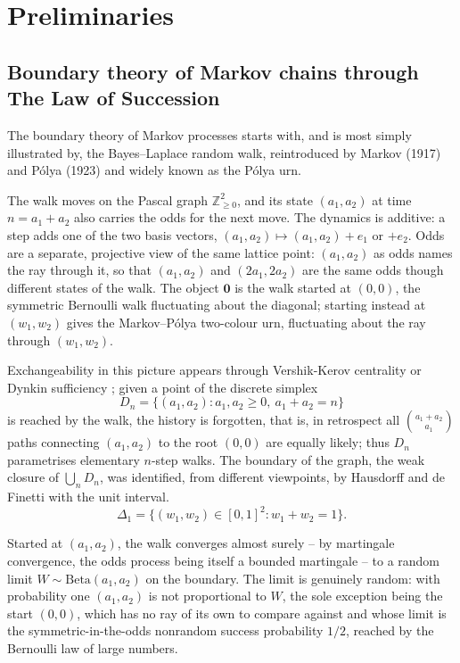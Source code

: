 \documentclass[11pt]{article}
\newcommand{\ZZ}{\mathbb{Z}}
\theoremstyle{plain}
\theoremstyle{definition}
\begin{document}
\section{Preliminaries}
\label{sec:prelim}
\subsection{Boundary theory of Markov chains through The Law of Succession}

The boundary theory of Markov processes starts with, and is most simply illustrated by, the Bayes--Laplace random walk, reintroduced by Markov (1917) and P\'olya (1923) and widely known as the P\'olya urn.

The walk moves on the Pascal graph \(\ZZ_{\ge0}^2\), and its state \((a_1,a_2)\) at time \(n=a_1+a_2\) also carries the odds for the next move. The dynamics is additive: a step adds one of the two basis vectors, \((a_1,a_2)\mapsto(a_1,a_2)+e_1\) or \(+e_2\). Odds are a separate, projective view of the same lattice point: \((a_1,a_2)\) as odds names the ray through it, so that \((a_1,a_2)\) and \((2a_1,2a_2)\) are the same odds though different states of the walk. The object \(\boldsymbol0\) is the walk started at \((0,0)\), the symmetric Bernoulli walk fluctuating about the diagonal; starting instead at \((w_1,w_2)\) gives the Markov--P\'olya two-colour urn, fluctuating about the ray through \((w_1,w_2)\).

Exchangeability in this picture appears through Vershik-Kerov \cite{BorodinOlshanski} centrality or Dynkin  
sufficiency \cite{DiaconisFridmanSufficiencyIndianInst};
given a point of the discrete simplex  
$$
D_n=\{(a_1,a_2):a_1,a_2\ge0,\ a_1+a_2=n\}$$ is reached by the walk, the history is forgotten, that is, in retrospect
all \(\binom{a_1+a_2}{a_1}\) paths connecting $(a_1,a_2)$ to the root $(0,0)$ are equally likely; thus $D_n$ parametrises elementary $n$-step walks. The boundary of the graph, the weak closure of \(\bigcup_nD_n\), was identified, from different viewpoints, by Hausdorff and de Finetti with the unit interval. 
$$\Delta_1=\{(w_1,w_2)\in [0,1]^2: w_1+w_2=1\}.$$

Started at \((a_1,a_2)\), the walk converges almost surely -- by martingale convergence, the odds process being itself a bounded martingale -- to a random limit \(W\sim\mathrm{Beta}(a_1,a_2)\) on the boundary. The limit is genuinely random: with probability one \((a_1,a_2)\) is not proportional to \(W\), the sole exception being the start \((0,0)\), which has no ray of its own to compare against and whose limit is the
symmetric-in-the-odds nonrandom success probability
 \(1/2\), reached by the Bernoulli law of large numbers.
\end{document}
